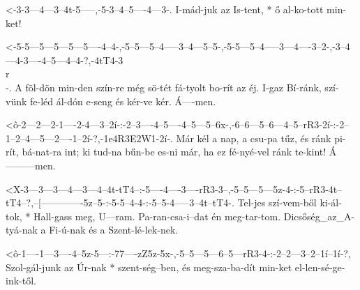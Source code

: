 
  {<-3-3---4---3--4t-5-----,-5-3--4--5----4---3-.}
  {  I-mád-juk az Is-tent, * ő al-ko-tott min-ket!}


  {<-5-5---5---5---5---5----4--4-,-5--5---5--4-----3--4---5--5-,-5-5---5--4-----3---4----3--2-,-3--4---4-3----4--5---4--4-?,-4tT4-3\\r\\-.}
  {  A föl-dön min-den szín-re még sö-tét fá-tyolt bo-rít az éj. I-gaz Bí-ránk, szí-vünk fe-léd ál-dón e-seng és kér-ve kér. Á----men.}


  {<ô-2---2---2-1----2-4---3--2í-:-2--3----4--5----4--5---5--6x-,-6--6---5--6---4--5--rR3-2í-:-2--1--2--4---5---2----1--2í-?,-1e4R3E2W1-2í-.}
  {   Már kél a nap, a csu-pa tűz, és ránk pi-rít, bá-nat-ra int; ki tud-na bűn-be es-ni  már, ha ez fé-nyé-vel ránk te-kint! Á---------men.}

  {<X-3---3---3---4---3---4--4t-tT4--:-5----4----3----rR3-3--,-5--5---5---5z-4-:-5--rR3-4t--tT4--?,--[-------------5z--5-:-5-5--4-4-:-5--5-4-----3--4t--tT4-.}
  {   Tel-jes szí-vem-ből ki-ál-tok, * Hall-gass meg, U---ram. Pa-ran-csa-i--dat én meg-tar-tom. Dicsőség_az_A-tyá-nak a Fi-ú-nak és a Szent-lé-lek-nek.}

  {<ô-1----1---3----4--5z-5---:-77----zZ5z-5x-,-5--5---5---6--5---rR3-4-:-2--2---3--2--1í--1í-?,}
  {   Szol-gál-junk az Úr-nak * szent-ség--ben, és meg-sza-ba-dít min-ket el-len-sé-ge-ink-től.}



